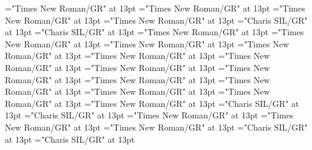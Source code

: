 \documentclass[a4paper]{article}
\begin{document}
\font\spanenCmPossibilitypublishStemTransTypeAbbreviationPubenCmTranslationpublishStemTypeConfigtranslationsexamplessensesensesentryletDatadicBody="Times New Roman/GR" at 13pt
\font\CmPossibilitypublishStemTransTypeNamePubenCmTranslationpublishStemTypeConfigtranslationsexamplessensesensesentryletDatadicBody="Times New Roman/GR" at 13pt
\font\spanenCmPossibilitypublishStemTransTypeNamePubenCmTranslationpublishStemTypeConfigtranslationsexamplessensesensesentryletDatadicBody="Times New Roman/GR" at 13pt
\font\spanenCmTranslationpublishStemTypeConfigtranslationsexamplessensesensesentryletDatadicBody="Times New Roman/GR" at 13pt
\font\translationLdtetranslationsexamplessensesensesentryletDatadicBody="Charis SIL/GR" at 13pt
\font\spantetranslationLdtetranslationsexamplessensesensesentryletDatadicBody="Charis SIL/GR" at 13pt
\font\spanentranslationLdtetranslationsexamplessensesensesentryletDatadicBody="Times New Roman/GR" at 13pt
\font\spanenexamplessensesensesentryletDatadicBody="Times New Roman/GR" at 13pt
\font\semanticdomainssensesensesentryletDatadicBody="Times New Roman/GR" at 13pt
\font\spanensemanticdomainssensesensesentryletDatadicBody="Times New Roman/GR" at 13pt
\font\semanticdomainabbrensemanticdomainssensesensesentryletDatadicBody="Times New Roman/GR" at 13pt
\font\spanensemanticdomainabbrensemanticdomainssensesensesentryletDatadicBody="Times New Roman/GR" at 13pt
\font\semanticdomainnameensemanticdomainssensesensesentryletDatadicBody="Times New Roman/GR" at 13pt
\font\spanensemanticdomainnameensemanticdomainssensesensesentryletDatadicBody="Times New Roman/GR" at 13pt
\font\spanensensesentryletDatadicBody="Times New Roman/GR" at 13pt
\font{}="Times New Roman/GR" at 13pt
\font\xitemendefinitionLdensensesensesentryletDatadicBody="Times New Roman/GR" at 13pt
\font\spanenxitemendefinitionLdensensesensesentryletDatadicBody="Times New Roman/GR" at 13pt
\font\spanendefinitionLdensensesensesentryletDatadicBody="Times New Roman/GR" at 13pt
\font\xitemtedefinitionLdensensesensesentryletDatadicBody="Charis SIL/GR" at 13pt
\font\spantexitemtedefinitionLdensensesensesentryletDatadicBody="Charis SIL/GR" at 13pt
\font\LexSensepublishStemGlossPubLdensensesensesentryletDatadicBody="Times New Roman/GR" at 13pt
\font\xitemenLexSensepublishStemGlossPubLdensensesensesentryletDatadicBody="Times New Roman/GR" at 13pt
\font\spanenxitemenLexSensepublishStemGlossPubLdensensesensesentryletDatadicBody="Times New Roman/GR" at 13pt
\font\xitemteLexSensepublishStemGlossPubLdensensesensesentryletDatadicBody="Charis SIL/GR" at 13pt
\font\spantexitemteLexSensepublishStemGlossPubLdensensesensesentryletDatadicBody="Charis SIL/GR" at 13pt
\end{document}
